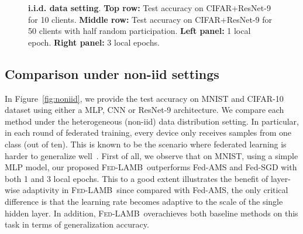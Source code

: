 \documentclass[11pt]{article}
\newcommand{\algo}{\textsc{Fed-LAMB}}
\begin{document}
\begin{figure}[t]
\begin{center}
    \end{center}
    \vspace{0.05in}
	\caption{\textbf{i.i.d. data setting}. \textbf{Top row:} Test accuracy on CIFAR+ResNet-9 for 10 clients. 
	\textbf{Middle row:} Test accuracy on CIFAR+ResNet-9 for 50 clients with half random participation.
	\textbf{Left panel:} 1 local epoch. \textbf{Right panel:} 3 local epochs. 
	}
	\label{fig:iid}
	\vspace{-0.1in}
\end{figure}



\subsection{Comparison under non-iid settings}

In Figure~\ref{fig:noniid}, we provide the test accuracy on  MNIST and CIFAR-10 dataset using either a MLP, CNN or ResNet-9 architecture. 
We compare each method under the heterogeneous (non-iid) data distribution setting. In particular, in each round of federated training, every device only receives samples from one class (out of ten). 
This is known to be the scenario where federated learning is harder to generalize well~\citet{mcmahan2017communication}. 
First of all, we observe that on MNIST, using a simple MLP model, our proposed \algo\ outperforms Fed-AMS and Fed-SGD with both 1 and 3 local epochs. This to a good extent illustrates the benefit of layer-wise adaptivity in \algo\, since compared with Fed-AMS, the only critical difference is that the learning rate becomes adaptive to the scale of the single hidden layer. 
In addition, \algo\ overachieves both baseline methods on this task in terms of generalization accuracy. 
\end{document}
